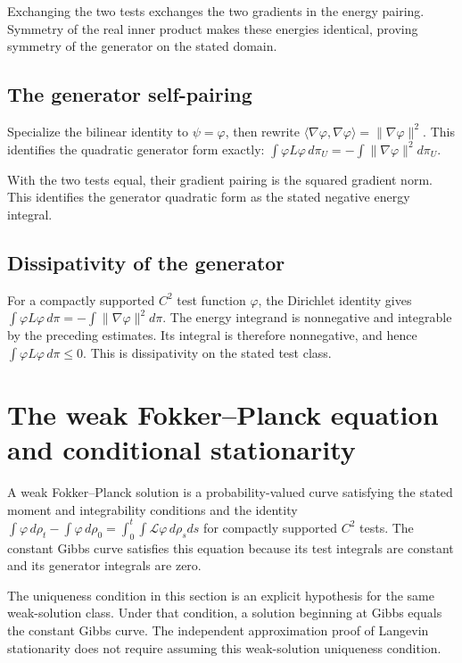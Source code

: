 \documentclass[11pt,a4paper]{article}
\begin{document}
Exchanging the two tests exchanges the two gradients in the energy pairing. Symmetry of the real inner product makes these energies identical, proving symmetry of the generator on the stated domain.


\subsection{\texorpdfstring{The generator self-pairing}{The generator self-pairing}}


Specialize the bilinear identity to \(\psi=\varphi\), then rewrite \(\langle\nabla\varphi,\nabla\varphi\rangle=\|\nabla\varphi\|^2\). This identifies the quadratic generator form exactly: \(\int\varphi L\varphi\,d\pi_U=-\int\|\nabla\varphi\|^2d\pi_U\).



With the two tests equal, their gradient pairing is the squared gradient norm. This identifies the generator quadratic form as the stated negative energy integral.


\subsection{\texorpdfstring{Dissipativity of the generator}{Dissipativity of the generator}}


For a compactly supported \(C^2\) test function \(\varphi\), the Dirichlet identity gives \(\int\varphi L\varphi\,d\pi=-\int\|\nabla\varphi\|^2d\pi\). The energy integrand is nonnegative and integrable by the preceding estimates. Its integral is therefore nonnegative, and hence \(\int\varphi L\varphi\,d\pi\le0\). This is dissipativity on the stated test class.


\section{\texorpdfstring{The weak Fokker–Planck equation and conditional stationarity}{The weak Fokker–Planck equation and conditional stationarity}}


A weak Fokker–Planck solution is a probability-valued curve satisfying the stated moment and integrability conditions and the identity \(\int\varphi\,d\rho_t-\int\varphi\,d\rho_0=\int_0^t\int\mathcal L\varphi\,d\rho_sds\) for compactly supported \(C^2\) tests. The constant Gibbs curve satisfies this equation because its test integrals are constant and its generator integrals are zero.



The uniqueness condition in this section is an explicit hypothesis for the same weak-solution class. Under that condition, a solution beginning at Gibbs equals the constant Gibbs curve. The independent approximation proof of Langevin stationarity does not require assuming this weak-solution uniqueness condition.
\end{document}

